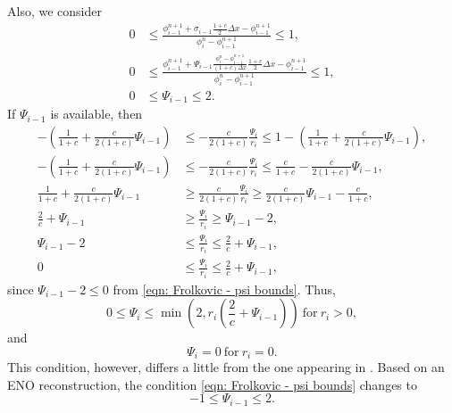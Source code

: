\documentclass[../thesis.tex]{subfiles}
\begin{document}
\begin{remark}
\begin{equation}
\end{equation}
Also, we consider
\begin{equation}
    \begin{split}\label{eqn: Frolkovic - psi bounds}
        0
        &\leq
        \frac{\phi_{i-1}^{n+1}
        +\sigma_{i-1}\frac{1+c}{2}\Delta x
        - \phi_{i-1}^{n+1}}{\phi_{i}^{n} - \phi_{i-1}^{n+1}}
        \leq
        1,
        \\
        0
        &\leq
        \frac{\phi_{i-1}^{n+1}
        +\Psi_{i-1}
        \frac{\phi_{i}^{n}-\phi_{i-1}^{n+1}}
        {(1+c)\Delta x}\frac{1+c}{2}\Delta x
        - \phi_{i-1}^{n+1}}{\phi_{i}^{n} - \phi_{i-1}^{n+1}}
        \leq
        1,
        \\
        0
        &\leq
        \Psi_{i-1}
        \leq
        2.
    \end{split}
\end{equation}
If \(\Psi_{i-1}\) is available, then
\begin{equation}
    \begin{split}
        -\left(
            \frac{1}{1+c} + \frac{c}{2(1+c)}\Psi_{i-1} \right)
        &\leq
        -\frac{c}{2(1+c)}
        \frac{\Psi_{i}}{r_{i}}
        \leq
        1-\left(
            \frac{1}{1+c} + \frac{c}{2(1+c)}\Psi_{i-1} \right),
        \\
        -\left(
            \frac{1}{1+c} + \frac{c}{2(1+c)}\Psi_{i-1} \right)
        &\leq
        -\frac{c}{2(1+c)}
        \frac{\Psi_{i}}{r_{i}}
        \leq
        \frac{c}{1+c} - \frac{c}{2(1+c)}\Psi_{i-1},
        \\
        \frac{1}{1+c} + \frac{c}{2(1+c)}\Psi_{i-1}
        &\geq
        \frac{c}{2(1+c)}
        \frac{\Psi_{i}}{r_{i}}
        \geq
        \frac{c}{2(1+c)}\Psi_{i-1} - \frac{c}{1+c},
        \\
        \frac{2}{c} + \Psi_{i-1}
        &\geq
        \frac{\Psi_{i}}{r_{i}}
        \geq
        \Psi_{i-1} - 2,
        \\
        \Psi_{i-1} - 2
        &\leq
        \frac{\Psi_{i}}{r_{i}}
        \leq
        \frac{2}{c} + \Psi_{i-1},
        \\
        0
        &\leq
        \frac{\Psi_{i}}{r_{i}}
        \leq
        \frac{2}{c} + \Psi_{i-1},
    \end{split}
\end{equation}
since \(\Psi_{i-1} - 2 \leq 0\) from \eqref{eqn: Frolkovic - psi bounds}.
Thus,
\begin{equation}
    0
    \leq
    \Psi_{i}
    \leq
    \min
    \left( 2,
    r_{i}\left( \frac{2}{c} + \Psi_{i-1} \right)
    \right)\ \text{for}\ r_{i} > 0,
\end{equation}
and
\begin{equation}
    \Psi_{i} = 0\ \text{for}\ r_{i} = 0.
\end{equation}
This condition, however, differs a little from the one appearing in \cite{2023_Frolkovic}. Based on an
ENO reconstruction, the condition \eqref{eqn: Frolkovic - psi bounds} changes to
\begin{equation}
    -1
    \leq
    \Psi_{i-1}
    \leq
    2.
\end{equation}


\end{remark}
\end{document}
